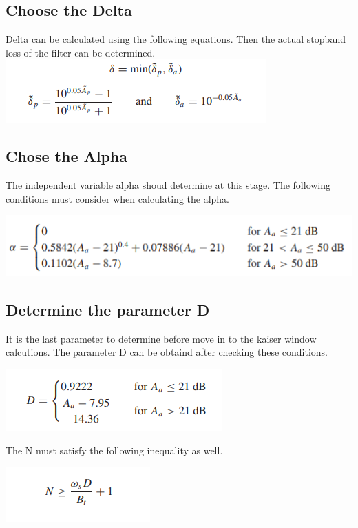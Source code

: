 \documentclass[oneside,11pt,onecolumn,a4paper]{report}
\begin{document}
\subsection{Choose the Delta}

\hspace{4em}Delta can be calculated using the following equations. Then the actual stopband loss of the filter can be determined.
\includegraphics{Screenshot (181)}

\subsection{Chose the Alpha}

\hspace{4em}The independent variable alpha shoud determine at this stage. The following conditions must consider when calculating the alpha.

\includegraphics{Screenshot (182)}

\subsection{Determine the parameter D}
\hspace{4em}It is the last parameter to determine before move in to the kaiser window calcutions. The parameter D can be obtaind after checking these conditions. 

\includegraphics{Screenshot (178)}

The N must satisfy the following inequality as well. 

\includegraphics{Screenshot (179)}
\end{document}
